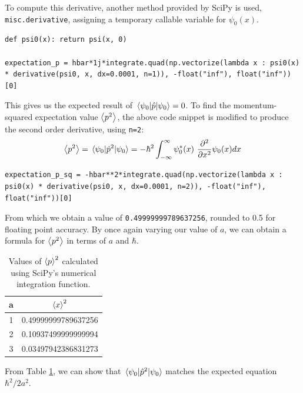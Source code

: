 \documentclass[a4paper]{article}
\begin{document}
To compute this derivative, another method provided by SciPy is used, \lstinline$misc.derivative$, assigning a temporary callable variable for $\psi_0(x)$. 
\begin{lstlisting}
def psi0(x): return psi(x, 0)

expectation_p = hbar*1j*integrate.quad(np.vectorize(lambda x : psi0(x) * derivative(psi0, x, dx=0.0001, n=1)), -float("inf"), float("inf"))[0]
\end{lstlisting} This gives us the expected result of $\mel{\psi_0}{\hat p}{\psi_0}=0$.
To find the momentum-squared expectation value $\expval{p^2}$, the above code snippet is modified to produce the second order derivative, using \lstinline$n=2$:
\begin{equation}
\expval {p^2}=\mel{\psi_0}{\hat p^2}{\psi_0}=-\hbar^2\int^\infty_{-\infty}\psi_0^*(x)\ \frac{\partial^2}{\partial x^2} \psi_0(x)dx
\end{equation}
\begin{lstlisting}
expectation_p_sq = -hbar**2*integrate.quad(np.vectorize(lambda x : psi0(x) * derivative(psi0, x, dx=0.0001, n=2)), -float("inf"), float("inf"))[0]
\end{lstlisting} From which we obtain a value of \lstinline$0.49999999789637256$, rounded to 0.5 for floating point accuracy. By once again varying our value of $a$, we can obtain a formula for $\expval{p^2}$ in terms of $a$ and $\hbar$.
\begin{table}[h!]
\centering
\begin{tabular}{cc}
a & $\expval x^2$ \\ \hline
1 & 0.49999999789637256  \\
2 & 0.10937499999999994 \\
3 & 0.03497942386831273
\end{tabular}
\caption{\label{tab:p_table}Values of $\expval p^2$ calculated using SciPy's numerical integration function.}
\end{table}

From Table \ref{tab:p_table}, we can show that $\mel{\psi_0}{\hat p^2}{\psi_0}$ matches the expected equation $\hbar^2/2a^2$.
\newpage
\end{document}
